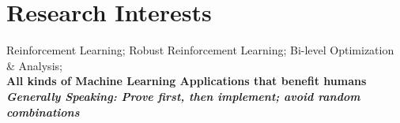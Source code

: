 \section{Research Interests}
    \quad Reinforcement Learning; Robust Reinforcement Learning; Bi-level Optimization \& Analysis; 
    \\\quad\textbf{All kinds of Machine Learning Applications that benefit humans}\\
    \quad \textit{\textbf{Generally Speaking: Prove first, then implement; avoid random combinations}}
    
